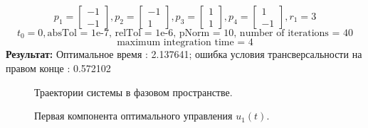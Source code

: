 \documentclass[10pt]{article}
\begin{document}
\[ p_1 = \begin{bmatrix}
      	-1 \\[0.3em]
      	-1
      \end{bmatrix} ,
p_2 = \begin{bmatrix}
      	-1 \\[0.3em]
      	1
      \end{bmatrix} ,
p_3 = \begin{bmatrix}
      	1 \\[0.3em]
      	1
      \end{bmatrix} ,
p_4 = \begin{bmatrix}
      	1 \\[0.3em]
      	-1
      \end{bmatrix}, r_1 = 3 \]
\[ t_0 = 0, \text{absTol = 1e-7, relTol = 1e-6, pNorm = 10, number of iterations = 40}\]  
\[\text{maximum integration time = 4} \]
\textbf{Результат:} Оптимальное время : 2.137641; ошибка условия трансверсальности на правом конце : 0.572102 
\medskip\\
\begin{figure}[h]
	\caption*{Траектории системы в фазовом пространстве.}
\end{figure}
\newpage
\begin{figure}[h]
	\caption*{Первая компонента оптимального управления \( u_1(t) \).}
\end{figure}
\end{document}

